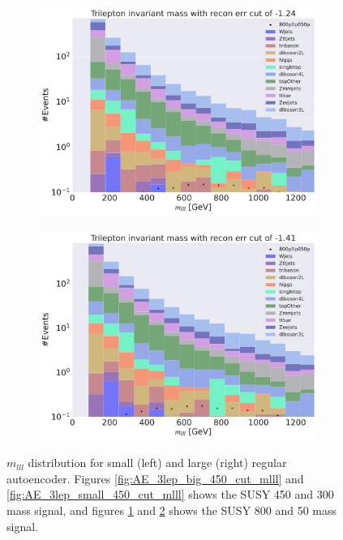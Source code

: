 \begin{figure}[H]
    \hfill
    \begin{subfigure}{.45\textwidth}
        \includegraphics[width=\textwidth]{Figures/AE_testing/big/3lep/b_data_recon_big_rm3_feats_sig_800p0p050p_mlll_recon_errcut_-1.24.pdf}
        \caption{}
        \label{fig:AE_3lep_big_800_cut_mlll}
    \end{subfigure}
    \hfill   
    \begin{subfigure}{.45\textwidth}
        \includegraphics[width=\textwidth]{Figures/AE_testing/small/3lep/b_data_recon_big_rm3_feats_sig_800p0p050p_mlll_recon_errcut_-1.41.pdf}
        \caption{}
        \label{fig:AE_3lep_small_800_cut_mlll}
    \end{subfigure}
    \hfill      
    \caption[Some $m_{lll}$ cuts for AE]{$m_{lll}$ distribution for small (left) and large (right) regular autoencoder.
    Figures \ref{fig:AE_3lep_big_450_cut_mlll} and \ref{fig:AE_3lep_small_450_cut_mlll} shows the SUSY 450 and 300 mass signal, 
    and figures \ref{fig:AE_3lep_big_800_cut_mlll} and \ref{fig:AE_3lep_small_800_cut_mlll} shows the SUSY 800 and 50 mass signal.}
    \label{fig:AE_3lep_recon_err_both_sig_cut_mlll}
\end{figure}

